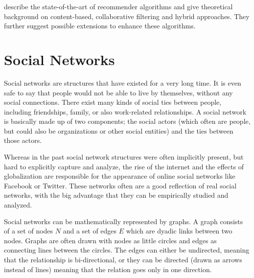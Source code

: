 \cite{Adomavicius_2005} describe the state-of-the-art of recommender algorithms and give theoretical background on content-based, collaborative filtering and hybrid approaches. They further suggest possible extensions to enhance these algorithms.

\section{Social Networks}
\label{s:socialnetworks} Social networks are structures that have existed for a very long time. It is even safe to say that people would not be able to live by themselves, without any social connections. There exist many kinds of social ties between people, including friendships, family, or also work-related relationships. A social network is basically made up of two components; the social actors (which often are people, but could also be organizations or other social entities) and the ties between those actors.

Whereas in the past social network structures were often implicitly present, but hard to explicitly capture and analyze, the rise of the internet and the effects of globalization are responsible for the appearance of online social networks like Facebook or Twitter. These networks often are a good reflection of real social networks, with the big advantage that they can be empirically studied and analyzed.

Social networks can be mathematically represented by graphs. A graph consists of a set of nodes $N$ and a set of edges $E$ which are dyadic links between two nodes. Graphs are often drawn with nodes as little circles and edges as connecting lines between the circles. The edges can either be undirected, meaning that the relationship is bi-directional, or they can be directed (drawn as arrows instead of lines) meaning that the relation goes only in one direction.

